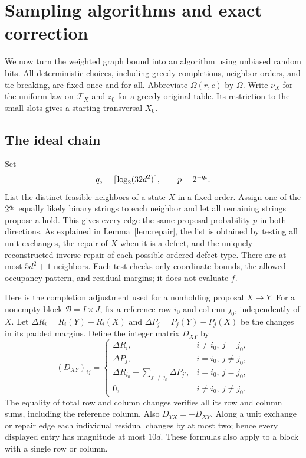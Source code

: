\section{Sampling algorithms and exact correction}\label{sec:algorithms}

We now turn the weighted graph bound into an algorithm using unbiased random
bits. All deterministic choices, including greedy completions, neighbor
orders, and tie breaking, are fixed once and for all. Abbreviate
$\Omega(r,c)$ by $\Omega$. Write
$\nu_X$ for the uniform law on $\mathcal F_X$ and $z_0$ for a greedy original
table. Its restriction to the small slots gives a starting transversal $X_0$.

\subsection{The ideal chain}

Set
\[
 q_{\rm s}=\lceil\log_2(32d^2)\rceil,
 \qquad p=2^{-q_{\rm s}}.
\]
List the distinct feasible neighbors of a state $X$ in a fixed order.
Assign one of the $2^{q_{\rm s}}$ equally likely binary strings to each
neighbor and let all remaining strings propose a hold. This gives every
edge the same proposal probability $p$ in both directions. As explained in
Lemma~\ref{lem:repair}, the list is obtained by testing all unit exchanges,
the repair of $X$ when it is a defect, and the uniquely reconstructed inverse
repair of each possible ordered defect type. There are at most $5d^2+1$
neighbors. Each test checks only coordinate bounds, the allowed occupancy
pattern, and residual margins; it does not evaluate $f$.

Here is the completion adjustment used for a nonholding proposal $X\to Y$.
For a nonempty block $\mathcal B=I\times J$, fix a reference row $i_0$ and
column $j_0$, independently of $X$. Let
$\Delta R_i=R_i(Y)-R_i(X)$ and $\Delta P_j=P_j(Y)-P_j(X)$ be the changes in
its padded margins. Define the integer matrix $D_{XY}$ by
\[
 (D_{XY})_{ij}=\begin{cases}
 \Delta R_i,&i\ne i_0,\ j=j_0,\\
 \Delta P_j,&i=i_0,\ j\ne j_0,\\
 \Delta R_{i_0}-\sum_{j'\ne j_0}\Delta P_{j'},&i=i_0,\ j=j_0,\\
 0,&i\ne i_0,\ j\ne j_0.
 \end{cases}
\]
The equality of total row and column changes verifies all its row and column
sums, including the reference column. Also $D_{YX}=-D_{XY}$. Along a unit
exchange or repair edge each individual residual changes by at most two;
hence every displayed entry has magnitude at most $10d$. These formulas
also apply to a block with a single row or column.

